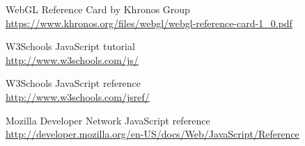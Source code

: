 \pagestyle{bibliographyStyle}
\thispagestyle{chapterBeginStyle}
\begin{thebibliography}{9}
	
	WebGL Reference Card by Khronos Group\\
	\url{https://www.khronos.org/files/webgl/webgl-reference-card-1_0.pdf}
	
	W3Schools JavaScript tutorial\\
	\url{http://www.w3schools.com/js/}
	
	W3Schools JavaScript reference\\
	\url{http://www.w3schools.com/jsref/}
	
	Mozilla Developer Network JavaScript reference\\
	\url{http://developer.mozilla.org/en-US/docs/Web/JavaScript/Reference}
	
\end{thebibliography}
\cleardoublepage